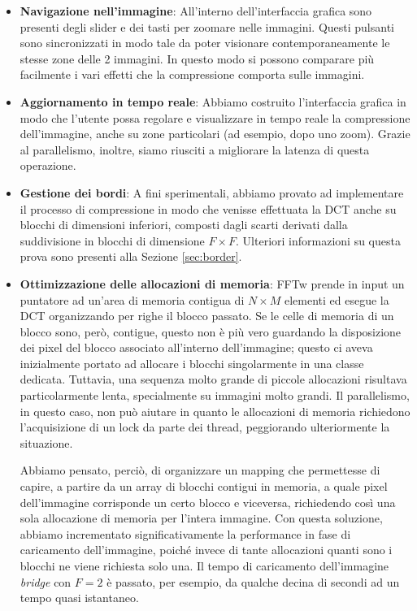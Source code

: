 \begin{itemize}
	\item \textbf{Navigazione nell'immagine}: All'interno dell'interfaccia grafica sono presenti degli slider e dei tasti per zoomare nelle immagini. Questi pulsanti sono sincronizzati in modo tale da poter visionare contemporaneamente le stesse zone delle 2 immagini. In questo modo si possono comparare più facilmente i vari effetti che la compressione comporta sulle immagini.
	\item \textbf{Aggiornamento in tempo reale}: Abbiamo costruito l'interfaccia grafica in modo che l'utente possa regolare e visualizzare in tempo reale la compressione dell'immagine, anche su zone particolari (ad esempio, dopo uno zoom). Grazie al parallelismo, inoltre, siamo riusciti a migliorare la latenza di questa operazione.
	\item  \textbf{Gestione dei bordi}:  A fini sperimentali, abbiamo provato ad implementare il processo di compressione in modo che venisse effettuata la DCT anche su blocchi di dimensioni inferiori, composti dagli scarti derivati dalla suddivisione in blocchi di dimensione $ F \times F$. Ulteriori informazioni su questa prova sono presenti alla Sezione \ref{sec:border}.
	
	\item \textbf{Ottimizzazione delle allocazioni di memoria}:
	FFTw prende in input un puntatore ad un'area di memoria contigua di $N \times M$ elementi ed esegue la DCT organizzando per righe il blocco passato. Se le celle di memoria di un blocco sono, però, contigue, questo non è più vero guardando la disposizione dei pixel del  blocco associato all'interno dell'immagine; questo ci aveva inizialmente portato ad allocare i blocchi singolarmente in una classe dedicata. Tuttavia, una sequenza molto grande di piccole allocazioni risultava particolarmente lenta, specialmente su immagini molto grandi. Il parallelismo, in questo caso, non può aiutare in quanto le allocazioni di memoria richiedono l'acquisizione di un lock da parte dei thread, peggiorando ulteriormente la situazione.
	
	Abbiamo pensato, perciò, di organizzare un mapping che permettesse di capire, a partire da un array di blocchi contigui in memoria, a quale pixel dell'immagine corrisponde un certo blocco e viceversa, richiedendo così una sola allocazione di memoria per l'intera immagine. Con questa soluzione, abbiamo incrementato significativamente la performance in fase di caricamento dell'immagine, poiché invece di tante allocazioni quanti sono i blocchi ne viene richiesta solo una. Il tempo di caricamento dell'immagine \textit{bridge} con $F=2$ è passato, per esempio, da qualche decina di secondi ad un tempo quasi istantaneo.
	\end{itemize}


